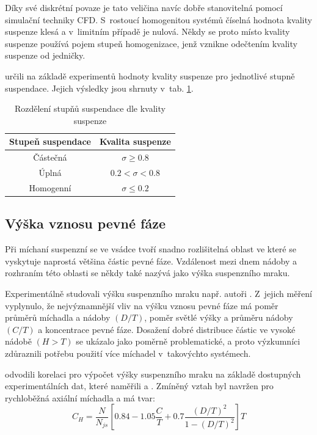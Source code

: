 \noindent Díky své diskrétní povaze je tato veličina navíc dobře stanovitelná pomocí simulační techniky CFD. S~rostoucí homogenitou systémů číselná hodnota kvality suspenze klesá a v~limitním případě je nulová. Někdy se proto místo kvality suspenze používá pojem stupeň homogenizace, jenž vznikne odečtením kvality suspenze od jedničky.

\citet{boh80} určili na základě experimentů hodnoty kvality suspenze pro jednotlivé stupně suspendace. Jejich výsledky jsou shrnuty v~tab. \ref{tab:kvasus}.

\begin{table}[h!]
\centering
\caption{Rozdělení stupňů suspendace dle kvality suspenze}
\label{tab:kvasus}
\begin{tabular}{cc}
\toprule
Stupeň suspendace & Kvalita suspenze \\
\midrule

Částečná &  $\sigma \geq \num{0.8}$ \\
Úplná & $\num{0.2} < \sigma < \num{0.8}$ \\
Homogenní & $\sigma \leq \num{0.2}$ \\

\bottomrule
\end{tabular}
\end{table}

\subsection{Výška vznosu pevné fáze}
Při míchaní suspenzní se ve vsádce tvoří snadno rozlišitelná oblast ve které se vyskytuje naprostá většina částic pevné fáze. Vzdálenost mezi dnem nádoby a rozhraním této oblasti se někdy také nazývá jako výška suspenzního mraku. 

Experimentálně studovali výšku suspenzního mraku např. autoři \citet{hic97}. Z~jejich měření vyplynulo, že nejvýznamnější vliv na výšku vznosu pevné fáze má poměr průměrů míchadla a nádoby $(D/T)$, poměr světlé výšky a průměru nádoby $(C/T)$ a koncentrace pevné fáze. Dosažení dobré distribuce částic ve vysoké nádobě $(H > T)$ se ukázalo jako poměrně problematické, a proto výzkumníci zdůraznili potřebu použití více míchadel v~takovýchto systémech.

\citet{bit02} odvodili korelaci pro výpočet výšky suspenzního mraku na základě dostupných experimentálních dat, které naměřili \citet{hic97} a \citet{buj99}. Zmíněný vztah byl navržen pro rychloběžná axiální míchadla a má tvar:
\begin{equation}
	C_{H}=\frac{N}{N_{js}}\left[\num{0.84} - \num{1.05}\frac{C}{T} + \num{0.7}\frac{(D/T)^{2}}{1 - (D/T)^{2}}  \right]T
	\label{eq:sushei}
\end{equation}  

